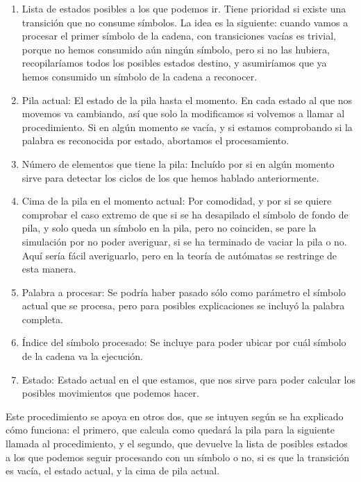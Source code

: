 \documentclass[12pt,a4paper,spanish]{book}
\begin{document}
\begin{enumerate}
\item Lista de estados posibles a los que podemos ir. Tiene prioridad si existe una transici\'on que no consume s\'imbolos. La idea es la siguiente: cuando vamos a procesar el primer s\'imbolo de la cadena, con transiciones vac\'ias es trivial, porque no hemos consumido a\'un ning\'un s\'imbolo, pero si no las hubiera, recopilar\'iamos todos los posibles estados destino, y asumir\'iamos que ya hemos consumido un s\'imbolo de la cadena a reconocer.
\item Pila actual: El estado de la pila hasta el momento. En cada estado al que nos movemos va cambiando, as\'i que solo la modificamos si volvemos a llamar al procedimiento. Si en alg\'un momento se vac\'ia, y si estamos comprobando si la palabra es reconocida por estado, abortamos el procesamiento.
\item N\'umero de elementos que tiene la pila: Inclu\'ido por si en alg\'un momento sirve para detectar los ciclos de los que hemos hablado anteriormente.
\item Cima de la pila en el momento actual: Por comodidad, y por si se quiere comprobar el caso extremo de que si se ha desapilado el s\'imbolo de fondo de pila, y solo queda un s\'imbolo en la pila, pero no coinciden, se pare la simulaci\'on por no poder averiguar, si se ha terminado de vaciar la pila o no. Aqu\'i ser\'ia f\'acil averiguarlo, pero en la teor\'ia de aut\'omatas se restringe de esta manera.

\item Palabra a procesar: Se podr\'ia haber pasado s\'olo como par\'ametro el s\'imbolo actual que se procesa, pero para posibles explicaciones se incluy\'o la palabra completa.
\item \'Indice del s\'imbolo procesado: Se incluye para poder ubicar por cu\'al s\'imbolo de la cadena va la ejecuci\'on.
\item Estado: Estado actual en el que estamos, que nos sirve para poder calcular los posibles movimientos que podemos hacer.
\end{enumerate}


Este procedimiento se apoya en otros dos, que se intuyen seg\'un se ha explicado c\'omo funciona: el primero, que calcula como quedar\'a la pila para la siguiente llamada al procedimiento, y el segundo, que devuelve la lista de posibles estados a los que podemos seguir procesando con un s\'imbolo o no, si es que la transici\'on es vac\'ia, el estado actual, y la cima de pila actual.\\
\end{document}

